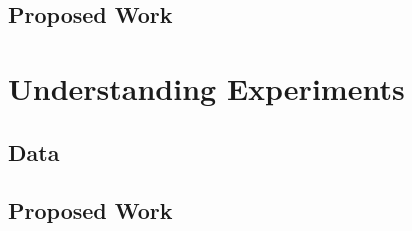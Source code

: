 \subsection{Proposed Work}

\section{Understanding Experiments}
\subsection{Data}
\subsection{Proposed Work}